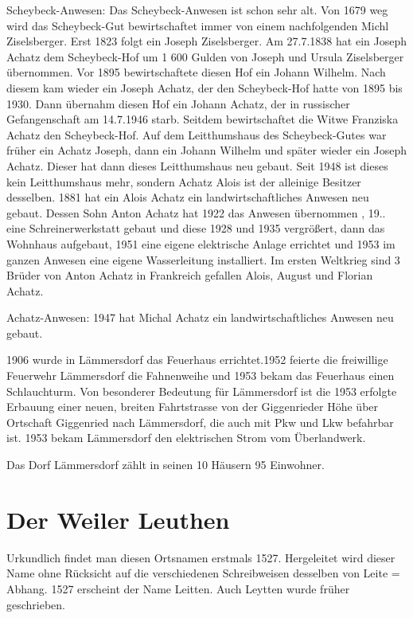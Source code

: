 \documentclass[12pt,a4pager]{book}
\begin{document}
Scheybeck-Anwesen: Das Scheybeck-Anwesen ist schon sehr alt. Von 1679 weg wird
das Scheybeck-Gut bewirtschaftet immer von einem nachfolgenden Michl
Ziselsberger. Erst 1823 folgt ein Joseph Ziselsberger. Am 27.7.1838 hat ein
Joseph Achatz dem Scheybeck-Hof um 1 600 Gulden von Joseph und Ursula
Ziselsberger übernommen. Vor 1895 bewirtschaftete diesen Hof ein Johann Wilhelm.
Nach diesem kam wieder ein Joseph Achatz, der den Scheybeck-Hof hatte von 1895
bis 1930. Dann übernahm diesen Hof ein Johann Achatz, der in russischer
Gefangenschaft am 14.7.1946 starb. Seitdem bewirtschaftet die Witwe Franziska
Achatz den Scheybeck-Hof. Auf dem Leitthumshaus des Scheybeck-Gutes war früher
ein Achatz Joseph, dann ein Johann Wilhelm und später wieder ein Joseph Achatz.
Dieser hat dann dieses Leitthumshaus neu gebaut. Seit 1948 ist dieses kein
Leitthumshaus mehr, sondern Achatz Alois ist der alleinige Besitzer desselben.
1881 hat ein Alois Achatz ein landwirtschaftliches Anwesen neu gebaut. Dessen
Sohn Anton Achatz hat 1922 das Anwesen übernommen , 19.. eine Schreinerwerkstatt
gebaut und diese 1928 und 1935 vergrößert, dann das Wohnhaus aufgebaut, 1951
eine eigene elektrische Anlage errichtet und 1953 im ganzen Anwesen eine eigene
Wasserleitung installiert. Im ersten Weltkrieg sind 3 Brüder von Anton Achatz in
Frankreich gefallen Alois, August und Florian Achatz.

Achatz-Anwesen: 1947 hat Michal Achatz ein landwirtschaftliches Anwesen neu
gebaut.

1906 wurde in Lämmersdorf das Feuerhaus errichtet.1952 feierte die freiwillige
Feuerwehr Lämmersdorf die Fahnenweihe und 1953 bekam das Feuerhaus einen
Schlauchturm. Von besonderer Bedeutung für Lämmersdorf ist die 1953 erfolgte
Erbauung einer neuen, breiten Fahrtstrasse von der Giggenrieder Höhe über
Ortschaft Giggenried nach Lämmersdorf, die auch mit Pkw und Lkw befahrbar ist.
1953 bekam Lämmersdorf den elektrischen Strom vom Überlandwerk.

Das Dorf Lämmersdorf zählt in seinen 10 Häusern 95 Einwohner.

\section{Der Weiler Leuthen}

Urkundlich findet man diesen Ortsnamen erstmals 1527. Hergeleitet wird dieser
Name ohne Rücksicht auf die verschiedenen Schreibweisen desselben von Leite =
Abhang. 1527 erscheint der Name Leitten. Auch Leytten wurde früher geschrieben.
\end{document}
